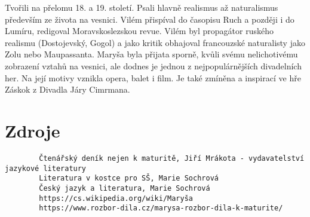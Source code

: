 \documentclass[11pt]{article}
\begin{document}
    Tvořili na přelomu 18. a 19. století.
    Psali hlavně realismus až naturalismus především ze života na vesnici.
    Vilém přispíval do časopisu Ruch a později i do Lumíru, redigoval Moravskoslezskou revue.
    Vilém byl propagátor ruského realismu (Dostojevský, Gogol) a jako kritik obhajoval francouzské naturalisty jako Zolu nebo Maupassanta.
    Maryša byla přijata sporně, kvůli svému nelichotivému zobrazení vztahů na vesnici, ale dodnes je jednou z nejpopulárnějších divadelních her.
    Na její motivy vznikla opera, balet i film. Je také zmíněna a inspirací ve hře Záskok z Divadla Járy Cimrmana.
    \section*{Zdroje}
    \begin{verbatim}
        Čtenářský deník nejen k maturitě, Jiří Mrákota - vydavatelství jazykové literatury
        Literatura v kostce pro SŠ, Marie Sochrová
        Český jazyk a literatura, Marie Sochrová
        https://cs.wikipedia.org/wiki/Maryša
        https://www.rozbor-dila.cz/marysa-rozbor-dila-k-maturite/
    \end{verbatim}
\end{document}
